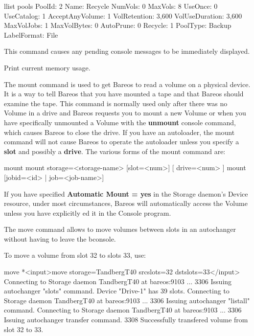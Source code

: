 \begin{description}
\begin{bconsole}{llist pools}
          PoolId: 2
            Name: Recycle
         NumVols: 0
         MaxVols: 8
         UseOnce: 0
      UseCatalog: 1
 AcceptAnyVolume: 1
    VolRetention: 3,600
  VolUseDuration: 3,600
      MaxVolJobs: 1
     MaxVolBytes: 0
       AutoPrune: 0
         Recycle: 1
        PoolType: Backup
     LabelFormat: File
\end{bconsole}

\item [messages]
   This command causes any pending  console messages to be immediately displayed.

\item [memory]
   Print current memory usage.


\item [mount]
   The mount command is used to get Bareos to read a volume on a physical
   device.  It is a way to tell Bareos that you have mounted a tape and
   that Bareos should examine the tape.  This command is normally
   used only after there was no Volume in a drive and Bareos requests you to mount a new
   Volume or when you have specifically unmounted a Volume with the {\bf
   unmount} console command, which causes Bareos to close the drive.  If
   you have an autoloader, the mount command will not cause Bareos to
   operate the autoloader unless you specify a {\bf slot} and possibly a
   {\bf drive}. The various forms of the mount command are:

\begin{bconsole}{mount}
mount  storage=<storage-name> [slot=<num>] [
       drive=<num> ]
mount [jobid=<id> | job=<job-name>]
\end{bconsole}

   If you have specified {\bf Automatic  Mount = yes} in the Storage daemon's
   Device resource,  under most circumstances, Bareos will automatically access
   the Volume unless you have explicitly ed it in  the Console
   program.

\item [move]
   The move command allows to move volumes between slots in an autochanger without
   having to leave the bconsole.

   To move a volume from slot 32 to slots 33, use:

\begin{bconsole}{move}
*<input>move storage=TandbergT40 srcslots=32 dstslots=33</input>
Connecting to Storage daemon TandbergT40 at bareos:9103 ...
3306 Issuing autochanger "slots" command.
Device "Drive-1" has 39 slots.
Connecting to Storage daemon TandbergT40 at bareos:9103 ...
3306 Issuing autochanger "listall" command.
Connecting to Storage daemon TandbergT40 at bareos:9103 ...
3306 Issuing autochanger transfer command.
3308 Successfully transfered volume from slot 32 to 33.
\end{bconsole}


\end{description}

